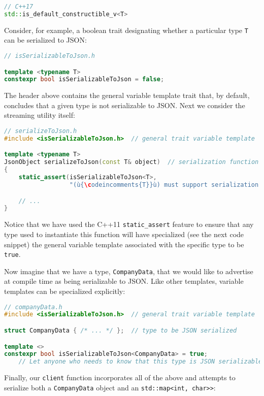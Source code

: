 {{{\begin{lstlisting}[language=C++, basicstyle={\ttfamily\footnotesize}]
// C++17
std::is_default_constructible_v<T>
\end{lstlisting}
      }}

Consider, for example, a boolean trait designating whether a particular
type \texttt{T} can be serialized to JSON:

\begin{lstlisting}[language=C++]
// isSerializableToJson.h

template <typename T>
constexpr bool isSerializableToJson = false;
\end{lstlisting}
    
\noindent The header above contains the general variable template trait that, by
default, concludes that a given type is not serializable to JSON. Next
we consider the streaming utility itself:

\begin{lstlisting}[language=C++]
// serializeToJson.h
#include <isSerializableToJson.h>  // general trait variable template

template <typename T>
JsonObject serializeToJson(const T& object)  // serialization function template
{
    static_assert(isSerializableToJson<T>,
                  "(ù{\codeincomments{T}}ù) must support serialization to JSON.");

    // ...
}
\end{lstlisting}
    
\noindent Notice that we have used the C++11
\texttt{static\_assert} feature to ensure that any type
used to instantiate this function will have specialized (see the next code snippet) the
general variable template associated with the specific type to be
\texttt{true}.

Now imagine that we have a type, \texttt{CompanyData}, that we would
like to advertise at compile time as being serializable to JSON. Like
other templates, variable templates can be specialized explicitly:

\begin{lstlisting}[language=C++]
// companyData.h
#include <isSerializableToJson.h>  // general trait variable template

struct CompanyData { /* ... */ };  // type to be JSON serialized

template <>
constexpr bool isSerializableToJson<CompanyData> = true;
    // Let anyone who needs to know that this type is JSON serializable.
\end{lstlisting}
    
\noindent Finally, our \texttt{client} function incorporates all of the above and
attempts to serialize both a \texttt{CompanyData} object and an
\texttt{std::map<int,}~\texttt{char>>}:

}
